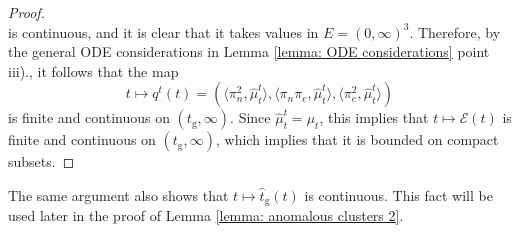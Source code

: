\begin{proof}
\begin{equation}
\end{equation} is continuous, and it is clear that it takes values in $E=(0,\infty)^3$. Therefore, by the general ODE considerations in Lemma \ref{lemma: ODE considerations} point iii)., it follows that the map \begin{equation}
    t\mapsto q^t(t)= \left(\langle \pi_n^2, \widehat{\mu}^t_t\rangle,\langle \pi_n\pi_e, \widehat{\mu}^t_t\rangle,\langle \pi_e^2, \widehat{\mu}^t_t\rangle\right)
\end{equation} is finite and continuous on $(t_\mathrm{g}, \infty).$  Since $\widehat{\mu}^t_t=\mu_t$, this implies that $t\mapsto \mathcal{E}(t)$ is finite and continuous on $(t_\mathrm{g}, \infty)$, which implies that it is bounded on compact subsets. \end{proof}

\begin{remark} The same argument also shows that $t\mapsto \widehat{t}_\mathrm{g}(t)$ is continuous. This fact will be used later in the proof of Lemma \ref{lemma: anomalous clusters 2}. \end{remark}

